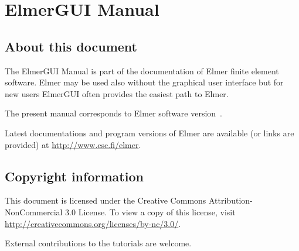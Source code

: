 \chapter*{ElmerGUI Manual}

\section*{About this document}

The ElmerGUI Manual is part of the documentation of Elmer finite element software. 
Elmer may be used also without the graphical user interface but for new 
users ElmerGUI often provides the easiest path to Elmer. 

The present manual corresponds to Elmer software version~\elmerversion{}.

Latest documentations and program versions of Elmer are available (or links are provided) at 
\url{http://www.csc.fi/elmer}. 

\section*{Copyright information}

This document is licensed under the Creative Commons Attribution-NonCommercial 3.0 License. 
To view a copy of this license, visit \url{http://creativecommons.org/licenses/by-nc/3.0/}.

External contributions to the tutorials are welcome. 


